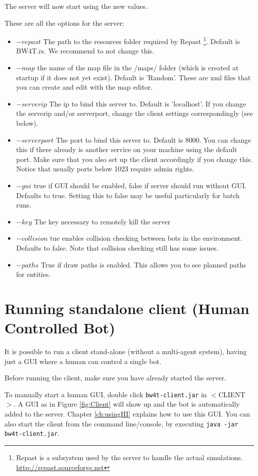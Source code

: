 \documentclass[11pt,a4paper]{article}
\begin{document}
The server will now start using the new values.

These are all the  options for the server:
\begin{itemize}
\item $-repast$ The path to the resources folder required by Repast \footnote{Repast is a subsystem used by the server to handle the actual simulations. \url{http://repast.sourceforge.net} }. Default is BW4T.rs. We recommend to not change this.  
\item $-map$ the name of the map file in the /maps/ folder (which is created at startup if it does not yet exist). Default is 'Random'. These are xml files that you can create and edit with the map editor.
\item $-serverip$ The ip to bind this server to. Default is 'localhost'. If you change the serverip and/or serverport, change the client settings correspondingly (see below). 
\item $-serverport$  The port to bind this server to. Default is 8000. You can change this if there already is another service on your machine using the default port. Make sure that you also set up the client accordingly if you change this. Notice that usually ports below 1023 require admin rights.
\item $-gui$ true if GUI should be enabled, false if server should run without GUI. Defaults to true. Setting this to false  may be useful particularly for batch runs.
\item $-key$ The key necessary to remotely kill the server
\item $-collision$ tue enables collision checking between bots in the environment. Defaults to false. Note that collision checking still has some issues.
\item $-paths$ True if draw paths is enabled. This allows you to see planned paths for entities.
\end{itemize}

\section{Running standalone client (Human Controlled Bot)}\label{ch:runclient}
It is possible to run a client stand-alone (without a multi-agent system), having just a GUI where a human can control a single bot.

Before running the client, make sure you have already started the server. 

To manually start a human GUI, double click \texttt{bw4t-client.jar} in $<$CLIENT$>$. A GUI as in Figure \ref{fig:Client} will show up and the bot is automatically added to the server. Chapter \ref{ch:usingHI} explains how to use this GUI. You can also start the client from the command line/console, by executing \texttt{java -jar bw4t-client.jar}.
\end{document}
